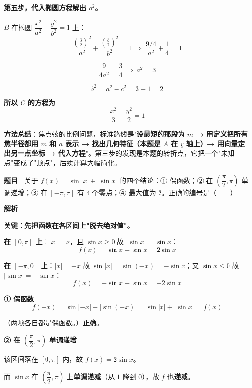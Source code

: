 \textbf{第五步，代入椭圆方程解出 $a^{2}$。}

$B$ 在椭圆 $\dfrac{x^{2}}{a^{2}}+\dfrac{y^{2}}{b^{2}}=1$ 上：
\[\frac{\left(\frac32\right)^{2}}{a^{2}}+\frac{\left(\frac b2\right)^{2}}{b^{2}}=1\ \Longrightarrow\ \frac{9/4}{a^{2}}+\frac14=1\]

\[\frac9{4a^{2}}=\frac34\ \Longrightarrow\ a^{2}=3\]

\[b^{2}=a^{2}-c^{2}=3-1=2\]

\textbf{所以 $C$ 的方程为}
\[\frac{x^{2}}3+\frac{y^{2}}2=1\]


\begin{gktip}
\textbf{方法总结}：焦点弦的比例问题，标准路线是"\textbf{设最短的那段为 $m$ → 用定义把所有焦半径都用 $m$ 和 $a$ 表示 → 找出几何特征（本题是 $A$ 在 $y$ 轴上）→ 用向量定出另一点坐标 → 代入方程}"。第三步的发现是本题的转折点，它把一个"未知点"变成了"顶点"，后续计算大幅简化。
\end{gktip}

\par\medskip


\textbf{题目}　关于 $f(x)=\sin|x|+|\sin x|$ 的四个结论：① 偶函数；② 在 $\left(\dfrac\pi2,\pi\right)$ 单调递增；③ 在 $[-\pi,\pi]$ 有 $4$ 个零点；④ 最大值为 $2$。正确的编号是（　　）

\textbf{解析}

\textbf{关键：先把函数在各区间上"脱去绝对值"。}

\textbf{在 $[0,\pi]$ 上}：$|x|=x$，且 $\sin x\ge0$ 故 $|\sin x|=\sin x$：
\[f(x)=\sin x+\sin x=2\sin x\]

\textbf{在 $[-\pi,0]$ 上}：$|x|=-x$ 故 $\sin|x|=\sin(-x)=-\sin x$；又 $\sin x\le0$ 故 $|\sin x|=-\sin x$：
\[f(x)=-\sin x-\sin x=-2\sin x\]

\par\medskip

\textbf{① 偶函数 }
\[f(-x)=\sin|-x|+|\sin(-x)|=\sin|x|+|\sin x|=f(x)\]

（两项各自都是偶函数。）\textbf{正确}。

\par\medskip

\textbf{② 在 $\left(\dfrac\pi2,\pi\right)$ 单调递增 }

该区间落在 $[0,\pi]$ 内，故 $f(x)=2\sin x$。

而 $\sin x$ 在 $\left(\dfrac\pi2,\pi\right)$ 上\textbf{单调递减}（从 $1$ 降到 $0$），故 $f$ 也\textbf{递减}。

